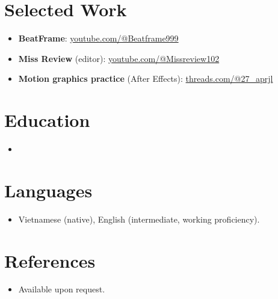 \documentclass[11pt,a4paper,sans]{moderncv}
\begin{document}

\section{Selected Work}
\vspace{1pt}
\begin{itemize}
\item {\textbf{BeatFrame}: \href{https://www.youtube.com/@Beatframe999}{youtube.com/@Beatframe999}}
\item {\textbf{Miss Review} (editor): \href{https://www.youtube.com/@Missreview102}{youtube.com/@Missreview102}}
\item {\textbf{Motion graphics practice} (After Effects): \href{https://www.threads.com/@27_aprjl}{threads.com/@27\_aprjl}}
\end{itemize}


\section{Education}
\vspace{1pt}
\begin{itemize}
\item{}
\end{itemize}


\section{Languages}
\vspace{1pt}
\begin{itemize}
\item {Vietnamese (native), English (intermediate, working proficiency).}
\end{itemize}


\section{References}
\vspace{1pt}
\begin{itemize}
\item{Available upon request.}
\end{itemize}
\end{document}
